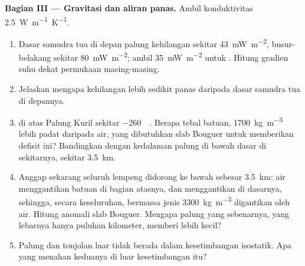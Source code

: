 \begin{problem}
\medskip
\noindent\textbf{Bagian III --- Gravitasi dan aliran panas.} Ambil konduktivitas
\qty{2.5}{W.m^{-1}.K^{-1}}.
\begin{enumerate}[resume]
  \item Dasar samudra tua di depan palung kehilangan sekitar \qty{43}{mW.m^{-2}}, busur-belakang
        sekitar \qty{80}{mW.m^{-2}}; ambil \qty{35}{mW.m^{-2}} untuk . Hitung gradien suhu
        dekat permukaan masing-masing.
  \item Jelaskan mengapa  kehilangan lebih sedikit panas daripada dasar samudra tua di
        depannya.
  \item {} di atas Palung Kuril sekitar \qty{-260}{\milli\gal}. Berapa tebal
        batuan, \qty{1700}{kg.m^{-3}} lebih padat daripada air, yang dibutuhkan slab Bouguer untuk
        memberikan defisit ini? Bandingkan dengan kedalaman palung di bawah dasar di sekitarnya,
        sekitar \qty{3.5}{km}.
  \item Anggap sekarang seluruh lempeng didorong ke bawah sebesar \qty{3.5}{km}: air menggantikan
        batuan di bagian atasnya, dan  menggantikan  di dasarnya, sehingga, secara
        keseluruhan,  bermassa jenis \qty{3300}{kg.m^{-3}} digantikan oleh air. Hitung anomali slab
        Bouguer. Mengapa palung yang sebenarnya, yang lebarnya hanya puluhan kilometer, memberi
        lebih kecil?
  \item Palung dan tonjolan luar tidak berada dalam kesetimbangan isostatik. Apa yang menahan
        keduanya di luar kesetimbangan itu?
\end{enumerate}


\end{problem}
